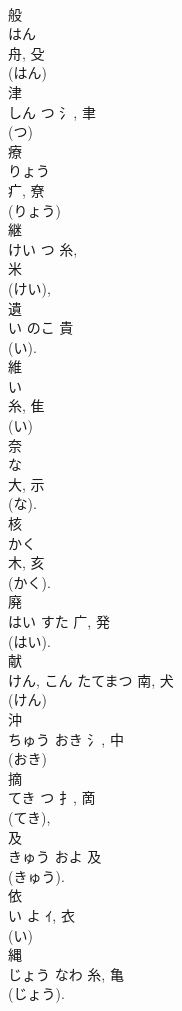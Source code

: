 \documentclass[8pt]{extreport}
\begin{document}
\begin{CJK}{UTF8}{min}
\\	般	
\\	はん	
\\	舟, 殳	
\\	(はん) 
\\	津	
\\	しん	つ	氵, 聿	
\\	(つ) 
\\	療	
\\	りょう	
\\	疒, 尞	
\\	(りょう) 
\\	継	
\\	けい	つ	糸, 
\\	米	
\\	(けい), 
\\	遺	
\\	い	のこ	貴		
\\	(い). 
\\	維	
\\	い	
\\	糸, 隹	
\\	(い) 
\\	奈	
\\	な	
\\	大, 示	
\\	(な). 
\\	核	
\\	かく	
\\	木, 亥	
\\	(かく). 
\\	廃	
\\	はい	すた	广, 発	
\\	(はい). 
\\	献	
\\	けん, こん	たてまつ	南, 犬	
\\	(けん) 
\\	沖	
\\	ちゅう	おき	氵, 中	
\\	(おき) 
\\	摘	
\\	てき	つ	扌, 啇	
\\	(てき), 
\\	及	
\\	きゅう	およ	及	
\\	(きゅう).	
\\	依	
\\	い	よ	ｲ, 衣	
\\	(い) 
\\	縄	
\\	じょう	なわ	糸, 亀	
\\	(じょう). 

\end{CJK}
\end{document}
